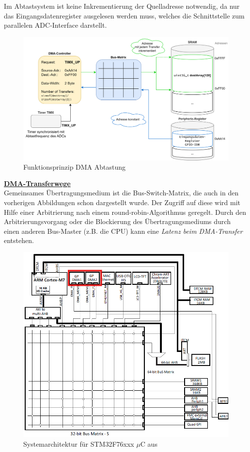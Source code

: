 \documentclass[a4paper, portrait, 12pt]{scrartcl} %
\begin{document}
\pagebreak
Im Abtastsystem ist keine Inkrementierung der Quelladresse notwendig, da nur das Eingangsdatenregister ausgelesen werden muss, welches die Schnittstelle zum parallelen ADC-Interface darstellt. 

\begin{figure}[H]
	\centering
    \includegraphics[scale=0.1]{Prinzip_DMA_Datenerfassung.png} 
	\caption{Funktionsprinzip DMA Abtastung}
	\label{fig:periph_to_mem}
\end{figure}

\pagebreak

\textbf{\underline{DMA-Transferwege}}\\

Gemeinsames Übertragungsmedium ist die Bus-Switch-Matrix, die auch in den vorherigen Abbildungen schon dargestellt wurde. Der Zugriff auf diese wird mit Hilfe einer Arbitrierung nach einem round-robin-Algorithmus geregelt. 
Durch den Arbitrierungsvorgang oder die Blockierung des Übertragungsmediums durch einen anderen Bus-Master (z.B. die CPU) kann eine \emph{Latenz beim DMA-Transfer} entstehen.

\begin{figure}[H]
	\centering
    \includegraphics[scale=0.7]{Systemarchitektur_STM32F7.png} 
	\caption{Systemarchitektur für STM32F76xxx $\mu$C aus \cite[S. 72]{STmicroelectronics2024}}
	\label{fig:sysarch_stm32f7}
\end{figure}
\end{document}
